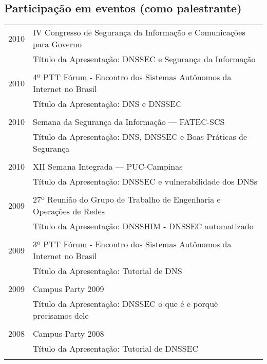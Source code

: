 \documentclass[a4paper, oneside, final]{scrartcl}
\begin{document}
\begin{center}
\section{Participação em eventos (como palestrante)}

\begin{tabularx}{0.97\linewidth}{p{2cm}X}
2010        & IV Congresso de Segurança da Informação e Comunicações para Go\-ver\-no\\
            & Título da Apresentação: DNSSEC e Segurança da Informação\\ \\

2010        & 4º PTT Fórum - Encontro dos Sistemas Autônomos da Internet no Brasil\\
            & Título da Apresentação: DNS e DNSSEC\\ \\

2010        & Semana da Segurança da Informação --- FATEC-SCS\\
            & Título da Apresentação: DNS, DNSSEC e Boas Práticas de Segurança\\ \\

2010        & XII Semana Integrada --- PUC-Campinas\\
            & Título da Apresentação: DNSSEC e vulnerabilidade dos DNSs\\ \\

2009        & 27º Reunião do Grupo de Trabalho de Engenharia e Operações de Redes\\
            & Título da Apresentação: DNSSHIM - DNSSEC automatizado\\ \\

2009        & 3º PTT Fórum - Encontro dos Sistemas Autônomos da Internet no Brasil\\
            & Título da Apresentação: Tutorial de DNS\\ \\

2009        & Campus Party 2009\\
            & Título da Apresentação: DNSSEC o que é e porquê precisamos dele\\ \\

2008        & Campus Party 2008\\
            & Título da Apresentação: Tutorial de DNSSEC\\ \\


\end{tabularx}
\end{center}
\end{document}
